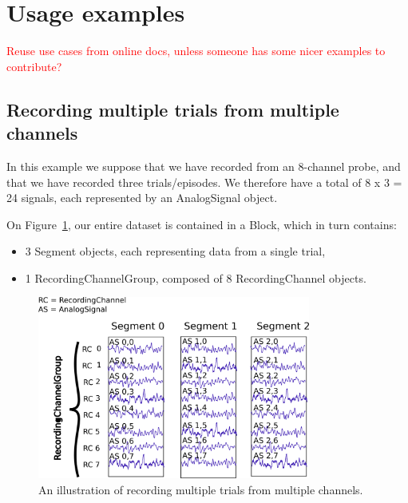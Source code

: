 \documentclass{frontiers}
\newcommand{\missing}[1]{\textcolor{red}{#1}}
\begin{document}
\section{Usage examples}

\missing{Reuse use cases from online docs, unless someone has some nicer examples to contribute?}


\subsection{Recording multiple trials from multiple channels}


In this example we suppose that we have recorded from an 8-channel probe, and that we have recorded three trials/episodes. We therefore have a total of 8 x 3 = 24 signals, each represented by an AnalogSignal object.

On Figure~\ref{fig:usecase1}, our entire dataset is contained in a Block, which in turn contains:
\begin{itemize}
\item 3 Segment objects, each representing data from a single trial,
\item 1 RecordingChannelGroup, composed of 8 RecordingChannel objects.
\end{itemize}

\begin{figure}
\centering
\includegraphics[width=0.8\textwidth]{figures/usecase1}
\caption{An illustration of recording multiple trials from multiple channels.}\label{fig:usecase1} 
\end{figure}
\end{document}
